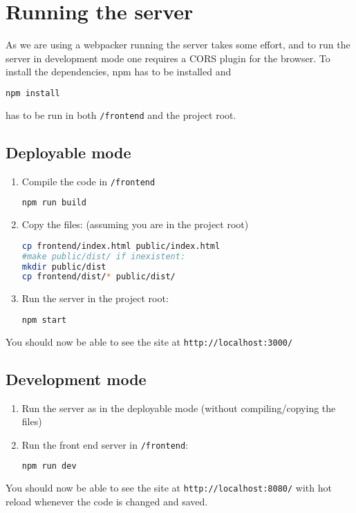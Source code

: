 \documentclass[a4paper]{article}
\begin{document}
\section{Running the server}
As we are using a webpacker running the server takes some effort, and to run the server in development mode one requires a CORS plugin for the browser. To install the dependencies, npm has to be installed and
\begin{lstlisting}[language=bash]
npm install
\end{lstlisting}
has to be run in both \texttt{/frontend} and the project root.

\subsection{Deployable mode}
\begin{enumerate}
\item Compile the code in \texttt{/frontend}
\begin{lstlisting}[language=bash]
npm run build
\end{lstlisting}
\item Copy the files: (assuming you are in the project root)
\begin{lstlisting}[language=bash]
cp frontend/index.html public/index.html
#make public/dist/ if inexistent:
mkdir public/dist
cp frontend/dist/* public/dist/
\end{lstlisting} 
\item Run the server in the project root:
\begin{lstlisting}[language=bash]
npm start
\end{lstlisting}
\end{enumerate}
You should now be able to see the site at \texttt{http://localhost:3000/}
\subsection{Development mode}
\begin{enumerate}
\item Run the server as in the deployable mode (without compiling/copying the files)
\item Run the front end server in \texttt{/frontend}:
\begin{lstlisting}[language=bash]
npm run dev
\end{lstlisting}
\end{enumerate}
You should now be able to see the site at \texttt{http://localhost:8080/} with hot reload whenever the code is changed and saved. 
\end{document}
